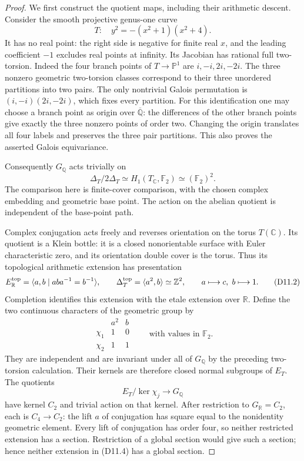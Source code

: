 \documentclass[11pt,oneside]{article}
\begin{document}
\begin{proof}
We first construct the quotient maps, including their
arithmetic descent. Consider the smooth projective
genus-one curve
\[
 T:\quad y^2=-(x^2+1)(x^2+4).
\]
It has no real point: the right side is negative for
finite real $x$, and the leading coefficient $-1$
excludes real points at infinity. Its Jacobian has
rational full two-torsion. Indeed the four branch
points of $T\to\mathbb P^1$ are
$i,-i,2i,-2i$. The three nonzero geometric two-torsion
classes correspond to their three unordered partitions
into two pairs. The only nontrivial Galois permutation
is $(i,-i)(2i,-2i)$, which fixes every partition.
For this identification one may choose a branch
point as origin over $\overline{\mathbb Q}$:
the differences of the other branch points give
exactly the three nonzero points of order two.
Changing the origin translates all four labels and
preserves the three pair partitions. This also proves
the asserted Galois equivariance.

Consequently $G_{\mathbb Q}$ acts trivially on
\[
 \Delta_T/2\Delta_T
   \simeq H_1(T_{\mathbb C},\mathbb F_2)
   \simeq(\mathbb F_2)^2 .
\]
The comparison here is finite-cover comparison, with
the chosen complex embedding and geometric base point.
The action on the abelian quotient is independent of
the base-point path.

Complex conjugation acts freely and reverses
orientation on the torus $T(\mathbb C)$. Its quotient
is a Klein bottle: it is a closed nonorientable surface
with Euler characteristic zero, and its orientation
double cover is the torus. Thus its topological
arithmetic extension has presentation
\[
 E_{\mathbb R}^{\rm top}
   =\langle a,b\mid aba^{-1}=b^{-1}\rangle,\qquad
 \Delta_T^{\rm top}=\langle a^2,b\rangle\simeq\mathbb Z^2,
 \qquad a\longmapsto c,\ b\longmapsto1.
 \tag{D11.2}
\]
Completion identifies this extension with the etale
extension over $\mathbb R$. Define the two continuous
characters of the geometric group by
\[
\begin{array}{c|cc}
 &a^2&b\\ \hline
 \chi_1&1&0\\
 \chi_2&1&1
\end{array}
 \qquad\text{with values in }\mathbb F_2 .
 \tag{D11.3}
\]
They are independent and are invariant under all of
$G_{\mathbb Q}$ by the preceding two-torsion calculation.
Their kernels are therefore closed normal subgroups
of $E_T$. The quotients
\[
 E_T/\ker\chi_j\longrightarrow G_{\mathbb Q}
 \tag{D11.4}
\]
have kernel $C_2$ and trivial action on that kernel.
After restriction to $G_{\mathbb R}=C_2$, each is
$C_4\to C_2$: the lift $a$ of conjugation has square
equal to the nonidentity geometric element.
Every lift of conjugation has order four, so neither
restricted extension has a section. Restriction of a
global section would give such a section; hence
neither extension in (D11.4) has a global section.


\end{proof}
\end{document}
